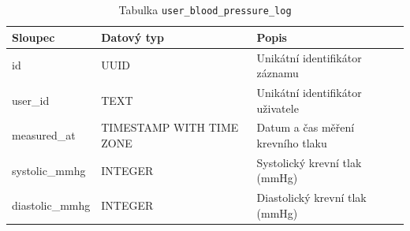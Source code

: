 \begin{table}[ht!]
    \centering
    \begin{tabularx}{\textwidth}{|l|l|L|}
        \hline
        \textbf{Sloupec} & \textbf{Datový typ}      & \textbf{Popis}                    \\ \hline
        id               & UUID                     & Unikátní identifikátor záznamu    \\ \hline
        user\_id         & TEXT                     & Unikátní identifikátor uživatele  \\ \hline
        measured\_at     & TIMESTAMP WITH TIME ZONE & Datum a čas měření krevního tlaku \\ \hline
        systolic\_mmhg   & INTEGER                  & Systolický krevní tlak (mmHg)     \\ \hline
        diastolic\_mmhg  & INTEGER                  & Diastolický krevní tlak (mmHg)    \\ \hline
    \end{tabularx}
    \caption{Tabulka \texttt{user\_blood\_pressure\_log}}
    \label{tab:user_blood_pressure_log}
\end{table}
